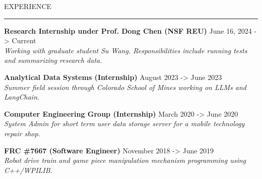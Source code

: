 \documentclass[10pt,letterpaper]{article}
\newcommand{\customtext}[2]{%
    {\fontsize{#1}{\dimexpr #1pt+2pt}\selectfont #2}%
}
\begin{document}
\begin{flushleft}
    \textcolor{headercolor}{\customtext{14}{EXPERIENCE}}
    \textcolor{gray}{\rule{\textwidth}{2pt}}

    {\customtext{12}{\textbf{Research Internship under Prof. Dong Chen (NSF REU)}} \hfill \customtext{12}{June 16, 2024 -> Current}} \\
    \customtext{10}{\textit{Working with graduate student Su Wang. Responsibilities include running tests and summarizing research data.}}
    \vspace{14pt}

    {\customtext{12}{\textbf{Analytical Data Systems (Internship)}} \hfill \customtext{12}{August 2023 -> June 2023}} \\
    \customtext{10}{\textit{Summer field session through Colorado School of Mines working on LLMs and LangChain.}}
    \vspace{14pt}

    {\customtext{12}{\textbf{Computer Engineering Group (Internship)}} \hfill \customtext{12}{March 2020 -> June 2020}} \\
    \customtext{10}{\textit{System Admin for short term user data storage server for a mobile technology repair shop.}}
    \vspace{14pt}

    {\customtext{12}{\textbf{FRC \#7667 (Software Engineer)}} \hfill \customtext{12}{November 2018 -> June 2019}} \\
    \customtext{10}{\textit{Robot drive train and game piece manipulation mechanism programming using C++/WPILIB.}}
    \vspace{14pt}

\end{flushleft}
\end{document}
